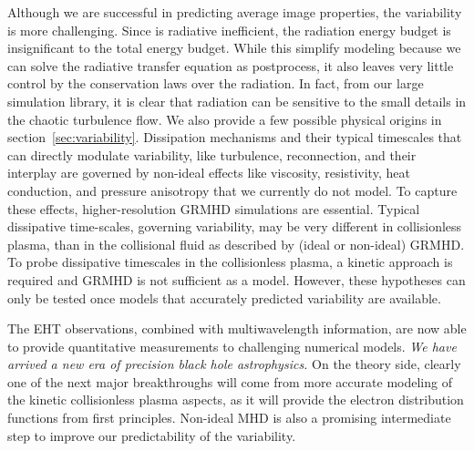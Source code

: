 Although we are successful in predicting average image properties, the
variability is more challenging.
Since \sgra is radiative inefficient, the radiation energy budget is
insignificant to the total energy budget.
While this simplify modeling because we can solve the radiative
transfer equation as postprocess, it also leaves very little control
by the conservation laws over the radiation.
In fact, from our large simulation library, it is clear that radiation
can be sensitive to the small details in the chaotic turbulence flow.
We also provide a few possible physical origins in
section~\ref{sec:variability}.
Dissipation mechanisms and their typical timescales that can directly
modulate variability, like turbulence, reconnection, and their
interplay are governed by non-ideal effects like viscosity,
resistivity, heat conduction, and pressure anisotropy that we
currently do not model.
To capture these effects, higher-resolution GRMHD simulations are
essential.
Typical dissipative time-scales, governing variability, may be very
different in collisionless plasma, than in the collisional fluid as
described by (ideal or non-ideal) GRMHD.
To probe dissipative timescales in the collisionless plasma, a kinetic
approach is required and GRMHD is not sufficient as a model.
However, these hypotheses can only be tested once models that
accurately predicted variability are available.

The EHT observations, combined with multiwavelength information, are
now able to provide quantitative measurements to challenging numerical
models.
\emph{We have arrived a new era of precision black hole astrophysics.}
On the theory side, clearly one of the next major breakthroughs will
come from more accurate modeling of the kinetic collisionless plasma
aspects, as it will provide the electron distribution functions from
first principles.
Non-ideal MHD is also a promising intermediate step to improve our
predictability of the variability.
